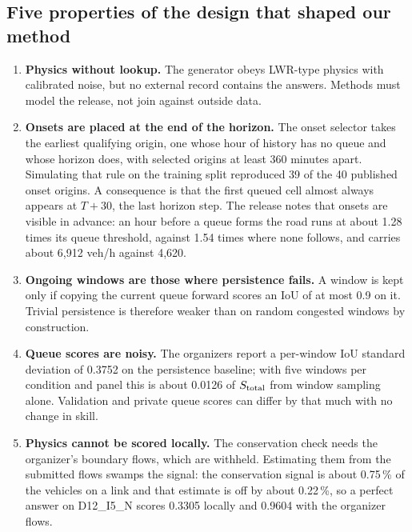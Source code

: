 \subsection{Five properties of the design that shaped our method}\label{sec:design}
\begin{enumerate}[label=\textbf{P\arabic*.},leftmargin=2.2em]
  \item \textbf{Physics without lookup.} The generator obeys LWR-type physics with calibrated noise, but no external
        record contains the answers. Methods must model the release, not join against outside data.
  \item \textbf{Onsets are placed at the end of the horizon.} The onset selector takes the earliest qualifying
        origin, one whose hour of history has no queue and whose horizon does, with selected origins at least 360
        minutes apart. Simulating that rule on the training split reproduced 39 of the 40 published onset origins. A consequence is that the first queued
        cell almost always appears at $T{+}30$, the last horizon step. The release notes that onsets are visible in
        advance: an hour before a queue forms the road runs at about 1.28 times its queue threshold, against 1.54
        times where none follows, and carries about 6,912 veh/h against 4,620.
  \item \textbf{Ongoing windows are those where persistence fails.} A window is kept only if copying the current
        queue forward scores an IoU of at most 0.9 on it. Trivial persistence is therefore weaker than on random
        congested windows by construction.
  \item \textbf{Queue scores are noisy.} The organizers report a per-window IoU standard deviation of 0.3752 on
        the persistence baseline; with five windows per condition and panel this is about 0.0126 of $S_{\mathrm{total}}$ from
        window sampling alone. Validation and private queue scores can differ by that much with no change in skill.
  \item \textbf{Physics cannot be scored locally.} The conservation check needs the organizer's boundary flows,
        which are withheld. Estimating them from the submitted flows swamps the signal: the conservation signal is
        about 0.75\,\% of the vehicles on a link and that estimate is off by about 0.22\,\%, so a perfect answer on
        D12\_I5\_N scores 0.3305 locally and 0.9604 with the organizer flows.
\end{enumerate}

